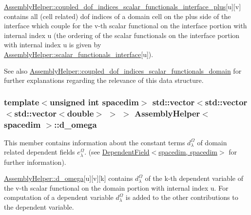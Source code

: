 \hyperlink{class_assembly_helper_af07bb528fdd350e9b467b08dc44a03e7}{Assembly\+Helper\+::coupled\+\_\+dof\+\_\+indices\+\_\+scalar\+\_\+functionals\+\_\+interface\+\_\+plus}\mbox{[}{\ttfamily u}\mbox{]}\mbox{[}{\ttfamily v}\mbox{]} contains all (cell related) dof indices of a domain cell on the plus side of the interface which couple for the {\ttfamily v-\/th} scalar functional on the interface portion with internal index {\ttfamily u} (the ordering of the scalar functionals on the interface portion with internal index {\ttfamily u} is given by \hyperlink{class_assembly_helper_a29aa77e0e8e6b35c94966ea88840e462}{Assembly\+Helper\+::scalar\+\_\+functionals\+\_\+interface}\mbox{[}{\ttfamily u}\mbox{]}).

See also \hyperlink{class_assembly_helper_a1a26b40224e3f04e5168accc91486493}{Assembly\+Helper\+::coupled\+\_\+dof\+\_\+indices\+\_\+scalar\+\_\+functionals\+\_\+domain} for further explanations regarding the relevance of this data structure. 
\subsubsection[{\texorpdfstring{d\+\_\+omega}{d_omega}}]{\setlength{\rightskip}{0pt plus 5cm}template$<$unsigned int spacedim$>$ std\+::vector$<$std\+::vector$<$std\+::vector$<$double$>$ $>$ $>$ {\bf Assembly\+Helper}$<$ spacedim $>$\+::d\+\_\+omega\hspace{0.3cm}{\ttfamily [private]}}\hypertarget{class_assembly_helper_ad93b109608d4425d318434e01cb6246c}{}\label{class_assembly_helper_ad93b109608d4425d318434e01cb6246c}
This member contains information about the constant terms $d^\Omega_\lambda$ of domain related dependent fields $e^\Omega_\lambda$. (see \hyperlink{class_dependent_field_3_01spacedim_00_01spacedim_01_4}{Dependent\+Field$<$spacedim, spacedim$>$} for further information).

\hyperlink{class_assembly_helper_ad93b109608d4425d318434e01cb6246c}{Assembly\+Helper\+::d\+\_\+omega}\mbox{[}{\ttfamily u}\mbox{]}\mbox{[}{\ttfamily v}\mbox{]}\mbox{[}{\ttfamily k}\mbox{]} contains $d^\Omega_\lambda$ of the {\ttfamily k-\/th} dependent variable of the {\ttfamily v-\/th} scalar functional on the domain portion with internal index {\ttfamily u}. For computation of a dependent variable $d^\Omega_{\lambda}$ is added to the other contributions to the dependent variable. 
